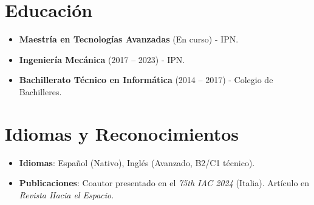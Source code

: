 \documentclass[10pt,letterpaper]{article}
\newcommand{\CVItem}[1]{\item #1}
\begin{document}
\section*{Educación}
\begin{itemize}[leftmargin=*, itemsep=0.2ex]
    \CVItem{\textbf{Maestría en Tecnologías Avanzadas} (En curso) - IPN.}
    \CVItem{\textbf{Ingeniería Mecánica} (2017 -- 2023) - IPN.}
    \CVItem{\textbf{Bachillerato Técnico en Informática} (2014 -- 2017) - Colegio de Bachilleres.}
\end{itemize}

\section*{Idiomas y Reconocimientos}
\begin{itemize}[leftmargin=*, itemsep=0.2ex]
    \CVItem{\textbf{Idiomas}: Español (Nativo), Inglés (Avanzado, B2/C1 técnico).}
    \CVItem{\textbf{Publicaciones}: Coautor presentado en el \textit{75th IAC 2024} (Italia). Artículo en \textit{Revista Hacia el Espacio}.}
\end{itemize}
\end{document}
